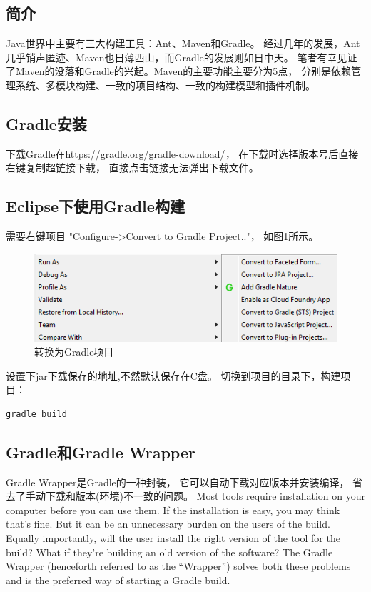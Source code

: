 \documentclass{book}
\begin{document}
\subsection{简介}

Java世界中主要有三大构建工具：Ant、Maven和Gradle。
经过几年的发展，Ant几乎销声匿迹、Maven也日薄西山，而Gradle的发展则如日中天。
笔者有幸见证了Maven的没落和Gradle的兴起。Maven的主要功能主要分为5点，
分别是依赖管理系统、多模块构建、一致的项目结构、一致的构建模型和插件机制。

\subsection{Gradle安装}

下载Gradle在\url{https://gradle.org/gradle-download/}，
在下载时选择版本号后直接右键复制超链接下载，
直接点击链接无法弹出下载文件。

\subsection{Eclipse下使用Gradle构建}

需要右键项目 "Configure->Convert to Gradle Project.."，
如图\ref{code:ConvertToGradleProject}所示。

\begin{figure}[htbp]
	\centering
	\includegraphics[scale=0.6]{ConvertToGradleProject.png}
	\caption{转换为Gradle项目}
	\label{code:ConvertToGradleProject}
\end{figure}

设置下jar下载保存的地址,不然默认保存在C盘。
切换到项目的目录下，构建项目：

\begin{lstlisting}[language=Bash]
gradle build
\end{lstlisting}

\subsection{Gradle和Gradle Wrapper}

Gradle Wrapper是Gradle的一种封装，
它可以自动下载对应版本并安装编译，
省去了手动下载和版本(环境)不一致的问题。
Most tools require installation on your computer before you can use them. 
If the installation is easy, you may think that’s fine. 
But it can be an unnecessary burden on the users of the build. 
Equally importantly, will the user install the right version of the tool for the build? 
What if they’re building an old version of the software?
The Gradle Wrapper (henceforth referred to as the “Wrapper”) 
solves both these problems and is the preferred way of starting a Gradle build.
\end{document}
